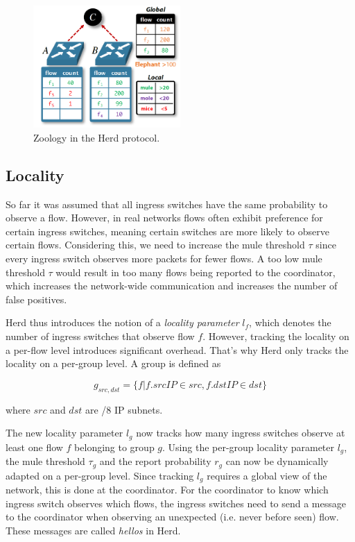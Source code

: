 \documentclass[11pt,oneside,a4paper]{article}
\begin{document}
\begin{figure}
	\centering
	\includegraphics[width=0.5\textwidth, scale=1]{figures/paper_zoo}
	\caption{Zoology in the Herd protocol.}
	\label{fig:zoo_fig}
\end{figure}

\subsection{Locality} \label{locality}
So far it was assumed that all ingress switches have the same probability to observe a flow. However, in real networks flows often exhibit preference for certain ingress switches, meaning certain switches are more likely to observe certain flows. Considering this, we need to increase the mule threshold $\tau$ since every ingress switch observes more packets for fewer flows. A too low mule threshold $\tau$ would result in too many flows being reported to the coordinator, which increases the network-wide communication and increases the number of false positives.

\noindent Herd thus introduces the notion of a \textit{locality parameter} $l_f$, which denotes the number of ingress switches that observe flow $f$. However, tracking the locality on a per-flow level introduces significant overhead. That's why Herd only tracks the locality on a per-group level. A group is defined as

$$g_{src,dst} = \{f | f.srcIP \in src, f.dstIP \in dst\}$$

\noindent where $src$ and $dst$ are /8 IP subnets.

\noindent The new locality parameter $l_g$ now tracks how many ingress switches observe at least one flow $f$ belonging to group $g$. Using the per-group locality parameter $l_g$, the mule threshold $\tau_g$ and the report probability $r_g$ can now be dynamically adapted on a per-group level. Since tracking $l_g$ requires a global view of the network, this is done at the coordinator. For the coordinator to know which ingress switch observes which flows, the ingress switches need to send a message to the coordinator when observing an unexpected (i.e. never before seen) flow. These messages are called \textit{hellos} in Herd.
\end{document}
